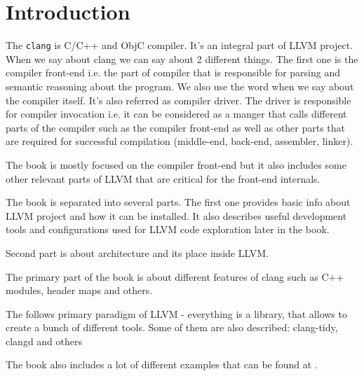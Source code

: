 \chapter{Introduction}

The \texttt{clang} is C/C++ and ObjC compiler. It's an
integral part of LLVM 
project. When we say about clang we can say about 2 different
things. The first one is the compiler front-end i.e. the part of
compiler that is responsible for parsing and semantic reasoning about
the program. We also use the word \clang when we say
about the compiler itself. It's also referred as compiler driver. The
driver is responsible for compiler invocation i.e. it can be
considered as a manger that calls different parts of the
compiler such as the compiler
front-end as well as other parts that are required for successful
compilation (middle-end, back-end, assembler, linker).

The book is mostly focused on the \clang compiler
front-end but it also includes some other relevant parts of
LLVM that are critical for the front-end internals.

The book is separated into several parts. The first one provides basic
info about LLVM project and how it can be installed. It also describes
useful development tools and configurations used for LLVM code
exploration later in the book.

Second part is about \clang architecture and its
place inside LLVM.

The primary part of the book is about different features of clang such as C++
modules, header maps and others.

The \clang follows primary paradigm of LLVM -
everything is a library, that allows to create a bunch of different
tools. Some of them are also described: clang-tidy, clangd and others

The book also includes a lot of different examples that can be found at
\cite{github:clangbook_src}.
